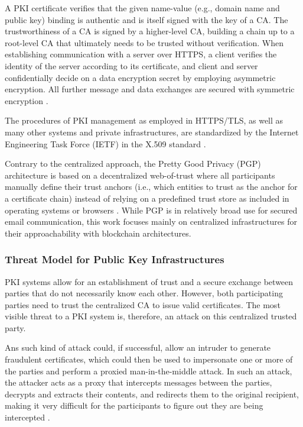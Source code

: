 A PKI certificate verifies that the given name-value (e.g., domain name and public key) binding is authentic and is itself signed with the key of a CA. The trustworthiness of a CA is signed by a higher-level CA, building a chain up to a root-level CA that ultimately needs to be trusted without verification. When establishing communication with a server over HTTPS, a client verifies the identity of the server according to its certificate, and client and server confidentially decide on a data encryption secret by employing asymmetric encryption. All further message and data exchanges are secured with symmetric encryption \cite{straub_tobias_usability_2006}.

The procedures of PKI management as employed in HTTPS/TLS, as well as many other systems and private infrastructures, are standardized by the Internet Engineering Task Force (IETF) in the X.509 standard \cite{adams_internet_2015}.

Contrary to the centralized approach, the Pretty Good Privacy (PGP) architecture is based on a decentralized web-of-trust where all participants manually define their trust anchors (i.e., which entities to trust as the anchor for a certificate chain) instead of relying on a predefined trust store as included in operating systems or browsers \cite{straub_tobias_usability_2006}. While PGP is in relatively broad use for secured email communication, this work focuses mainly on centralized infrastructures for their approachability with blockchain architectures.


\subsubsection{Threat Model for Public Key Infrastructures}
\label{subsubsec:threat_model_pki}

PKI systems allow for an establishment of trust and a secure exchange between parties that do not necessarily know each other. However, both participating parties need to trust the centralized CA to issue valid certificates. The most visible threat to a PKI system is, therefore, an attack on this centralized trusted party.

Ans such kind of attack could, if successful, allow an intruder to generate fraudulent certificates, which could then be used to impersonate one or more of the parties and perform a proxied man-in-the-middle attack. In such an attack, the attacker acts as a proxy that intercepts messages between the parties, decrypts and extracts their contents, and redirects them to the original recipient, making it very difficult for the participants to figure out they are being intercepted \cite{zusman_criminal_2008}.

